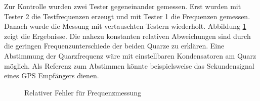 Zur Kontrolle wurden zwei Tester gegeneinander gemessen.
Erst wurden mit Tester 2 die Testfrequenzen erzeugt und mit Tester 1 die Frequenzen gemessen.
Danach wurde die Messung mit vertauschten Testern wiederholt.
Abbildung \ref{fig:freq-ppm} zeigt die Ergebnisse.
Die nahezu konstanten relativen Abweichungen sind durch die geringen Frequenzunterschiede der beiden Quarze zu erklären.
Eine Abstimmung der Quarzfrequenz wäre mit einstellbaren Kondensatoren am Quarz möglich.
Als Referenz zum Abstimmen könnte beispielsweise das Sekundensignal eines GPS Empfängers dienen.

\begin{figure}[H]
\centering

\caption{Relativer Fehler für Frequenzmessung }
\label{fig:freq-ppm}
\end{figure}

